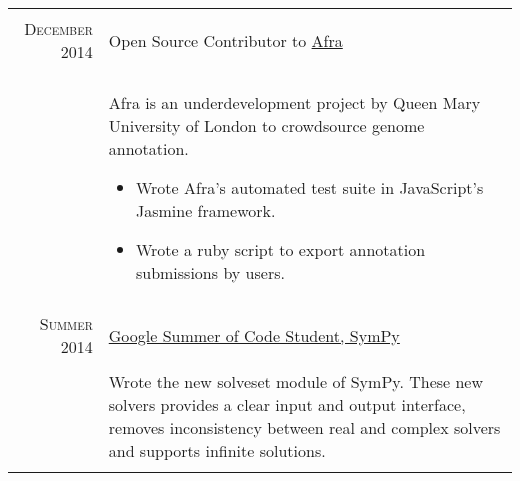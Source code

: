 \documentclass[a4paper,10pt]{article}
\begin{document}
\begin{tabular}{r|p{12cm}}
\\\multicolumn{2}{c}{} \\




    \textsc{December 2014} & Open Source Contributor to \href{http://afra.sbcs.qmul.ac.uk/}{Afra}
        \emph{}\\& \\&
        Afra is an underdevelopment project by Queen Mary
    University of London to crowdsource genome annotation.
\begin{itemize}
        \item Wrote Afra's automated test suite in JavaScript's Jasmine
            framework.
        \item Wrote a ruby script to export annotation submissions by users.
\end{itemize}\\\multicolumn{2}{c}{} \\




\textsc{Summer 2014} &
\href{https://github.com/sympy/sympy/wiki/GSoC-2014-Application-Harsh-Gupta:-Solvers}{Google
Summer of Code Student, SymPy}
\emph{}\\& \\&
Wrote the new solveset module of SymPy. These new
solvers provides a clear input and output interface, removes inconsistency
between real and complex solvers and supports infinite solutions.\\\multicolumn{2}{c}{} \\

%
%
\end{tabular}
\end{document}
